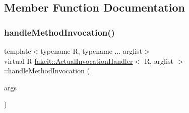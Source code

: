 \subsection{Member Function Documentation}
\mbox{\label{structfakeit_1_1ActualInvocationHandler_ad44424f6b71c6d5587e80057771d1717}} 
\subsubsection{\texorpdfstring{handleMethodInvocation()}{handleMethodInvocation()}\hspace{0.1cm}{\footnotesize\ttfamily [1/9]}}
{\footnotesize\ttfamily template$<$typename R, typename ... arglist$>$ \\
virtual R \mbox{\hyperlink{structfakeit_1_1ActualInvocationHandler}{fakeit\+::\+Actual\+Invocation\+Handler}}$<$ R, arglist $>$\+::handle\+Method\+Invocation (\begin{DoxyParamCaption}\item[{\mbox{\hyperlink{namespacefakeit_a476a37a598825e1b5dd67b3a176491a1}{Arguments\+Tuple}}$<$ arglist... $>$ \&}]{args }\end{DoxyParamCaption})\hspace{0.3cm}{\ttfamily [pure virtual]}}




